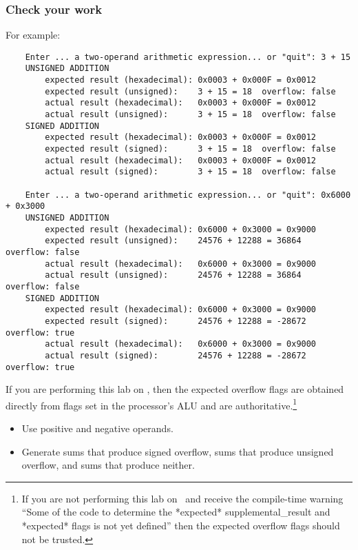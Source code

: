\subsubsection*{Check your work}

\begin{description}
\end{description}
For example:
\begin{verbatim}
    Enter ... a two-operand arithmetic expression... or "quit": 3 + 15
    UNSIGNED ADDITION
        expected result (hexadecimal): 0x0003 + 0x000F = 0x0012
        expected result (unsigned):    3 + 15 = 18	overflow: false
        actual result (hexadecimal):   0x0003 + 0x000F = 0x0012
        actual result (unsigned):      3 + 15 = 18	overflow: false
    SIGNED ADDITION
        expected result (hexadecimal): 0x0003 + 0x000F = 0x0012
        expected result (signed):      3 + 15 = 18	overflow: false
        actual result (hexadecimal):   0x0003 + 0x000F = 0x0012
        actual result (signed):        3 + 15 = 18	overflow: false

    Enter ... a two-operand arithmetic expression... or "quit": 0x6000 + 0x3000
    UNSIGNED ADDITION
        expected result (hexadecimal): 0x6000 + 0x3000 = 0x9000
        expected result (unsigned):    24576 + 12288 = 36864	overflow: false
        actual result (hexadecimal):   0x6000 + 0x3000 = 0x9000
        actual result (unsigned):      24576 + 12288 = 36864	overflow: false
    SIGNED ADDITION
        expected result (hexadecimal): 0x6000 + 0x3000 = 0x9000
        expected result (signed):      24576 + 12288 = -28672	overflow: true
        actual result (hexadecimal):   0x6000 + 0x3000 = 0x9000
        actual result (signed):        24576 + 12288 = -28672	overflow: true
\end{verbatim}

If you are performing this lab on \runtimeenvironment, then the expected overflow flags are obtained directly from flags set in the processor's ALU and are authoritative.\footnote{
    If you are not performing this lab on \runtimeenvironment\ and receive the compile-time warning ``Some of the code to determine the *expected* supplemental\_result and *expected* flags is not yet defined'' then the expected overflow flags should not be trusted.
}

\begin{description}
    \begin{itemize}
        \item Use positive and negative operands.
        \item Generate sums that produce signed overflow, sums that produce unsigned overflow, and sums that produce neither.
    \end{itemize}
\end{description}


